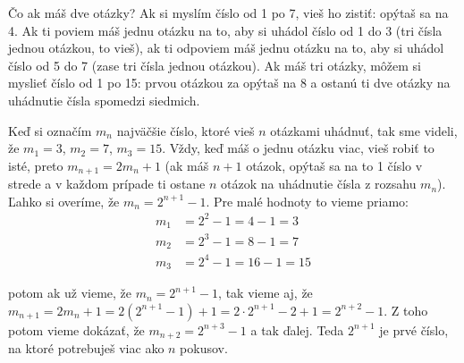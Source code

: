 \documentclass[10pt]{article}
\def\ods{\vspace*{10pt}}
\begin{document}
\ods
Čo ak máš dve otázky? Ak si myslím číslo od 1 po 7, vieš ho zistiť: opýtaš sa na 4. Ak ti
poviem  máš jednu otázku na to, aby si uhádol číslo od 1 do 3 (tri čísla jednou
otázkou, to vieš), ak ti
odpoviem  máš jednu otázku na to, aby si uhádol číslo od 5 do 7 (zase tri čísla
jednou otázkou). Ak máš tri otázky, môžem si myslieť číslo od 1 po 15: prvou otázkou
za opýtaš na 8 a ostanú ti dve otázky na uhádnutie čísla spomedzi siedmich.

\ods
Keď si označím $m_n$ najväčšie číslo, ktoré vieš $n$ otázkami uhádnuť, tak sme videli,
že $m_1=3$, $m_2=7$, $m_3=15$. Vždy, keď máš o jednu otázku viac, vieš robiť to isté,
preto $m_{n+1}=2m_n+1$ (ak máš $n+1$ otázok, opýtaš sa na to 1 číslo v strede a 
v každom prípade ti ostane $n$ otázok na uhádnutie čísla z rozsahu  $m_n$). Ľahko si overíme,
že $m_n=2^{n+1}-1$. Pre malé hodnoty to vieme priamo:
\begin{align*}
  m_1&=2^2-1=4-1=3 \\
  m_2&=2^3-1=8-1=7 \\
  m_3&=2^4-1=16-1=15
\end{align*}

potom ak už vieme, že $m_n=2^{n+1}-1$, tak vieme aj, že $m_{n+1}=2m_n+1=2(2^{n+1}-1)+1=
2\cdot2^{n+1}-2+1=2^{n+2}-1$. Z toho potom vieme dokázať, že $m_{n+2}=2^{n+3}-1$ a tak ďalej.
Teda $2^{n+1}$ je prvé číslo, na ktoré potrebuješ viac ako $n$ pokusov. 
\end{document}
